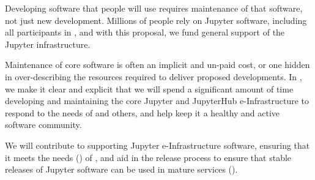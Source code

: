 \begin{task}[
  title=Maintenance of Jupyter and JupyterHub,
  id=maintenance,
  lead=SRL,
  PM=44,
  wphases={0-48},
  partners={XFEL,UPSUD,QS}
]
  Developing software that people will use requires maintenance of that software,
  not just new development.
  Millions of people rely on Jupyter software,
  including all participants in \TheProject,
  and with this proposal, we fund general support of the Jupyter infrastructure.

  Maintenance of core software is often an implicit and un-paid cost,
  or one hidden in over-describing the resources required to deliver
  proposed developments.
  In \TheProject, we make it clear and explicit that we will spend a significant amount
  of time developing and maintaining the core Jupyter and JupyterHub
  e-Infrastructure to respond to the needs of \TheProject and others,
  and help keep it a healthy and active software community.

  We will contribute to supporting Jupyter e-Infrastructure software,
  ensuring that it meets the needs ()
  of \TheProject,
  and aid in the release process to ensure that stable releases
  of Jupyter software can be used in mature \TheProject services
  ().
\end{task}
